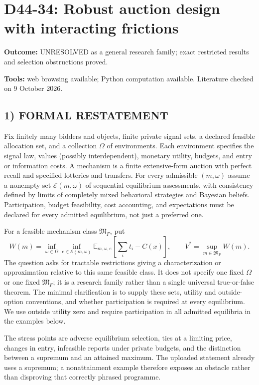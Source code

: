 \documentclass[11pt,a4paper]{article}
\newcommand{\E}{\mathbb E}
\theoremstyle{definition}
\begin{document}
\section*{D44-34: Robust auction design with interacting frictions}
\textbf{Outcome:} UNRESOLVED as a general research family; exact restricted results and selection obstructions proved.\par\textbf{Tools:} web browsing available; Python computation available. Literature checked on 9 October 2026.
\subsection*{1) FORMAL RESTATEMENT}
Fix finitely many bidders and objects, finite private signal sets, a declared feasible allocation set, and a collection $\Omega$ of environments. Each environment specifies the signal law, values (possibly interdependent), monetary utility, budgets, and entry or information costs. A mechanism is a finite extensive-form auction with perfect recall and specified lotteries and transfers. For every admissible $(m,\omega)$ assume a nonempty set $\mathcal E(m,\omega)$ of sequential-equilibrium assessments, with consistency defined by limits of completely mixed behavioral strategies and Bayesian beliefs. Participation, budget feasibility, cost accounting, and expectations must be declared for every admitted equilibrium, not just a preferred one.

For a feasible mechanism class $\mathfrak M_F$, put
\[
 W(m)=\inf_{\omega\in\Omega}\inf_{e\in\mathcal E(m,\omega)}
       \E_{m,\omega,e}\left[\sum_i t_i-C(x)\right],
 \qquad V^*=\sup_{m\in\mathfrak M_F}W(m).
\]
The question asks for tractable restrictions giving a characterization or approximation relative to this same feasible class. It does not specify one fixed $\Omega$ or one fixed $\mathfrak M_F$; it is a research family rather than a single universal true-or-false theorem. The minimal clarification is to supply these sets, utility and outside-option conventions, and whether participation is required at every equilibrium. We use outside utility zero and require participation in all admitted equilibria in the examples below.

The stress points are adverse equilibrium selection, ties at a limiting price, changes in entry, infeasible reports under private budgets, and the distinction between a supremum and an attained maximum. The uploaded statement already uses a supremum; a nonattainment example therefore exposes an obstacle rather than disproving that correctly phrased programme.
\end{document}
